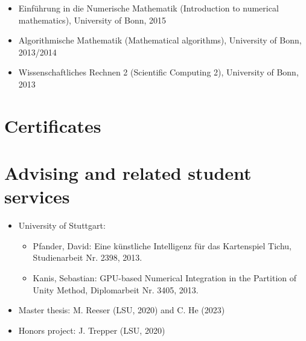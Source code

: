 \documentclass[11pt,a4paper,sans]{moderncv}
\begin{document}
\begin{itemize}[leftmargin=4cm]
\item Einf\"uhrung in die Numerische Mathematik (Introduction to numerical mathematics), University of Bonn, 2015
\item Algorithmische Mathematik (Mathematical algorithms), University of Bonn, 2013/2014
\item Wissenschaftliches Rechnen 2 (Scientific Computing 2),  University of Bonn, 2013 
\end{itemize}


\section{Certificates}

\section{Advising and related student services}
\begin{itemize}[leftmargin=4cm]
\item University of Stuttgart:
\begin{itemize}
\item Pfander, David: Eine künstliche Intelligenz für das Kartenspiel Tichu, Studienarbeit Nr. 2398, 2013.
\item Kanis, Sebastian: GPU-based Numerical Integration in the Partition of Unity Method, Diplomarbeit Nr. 3405, 2013.
\end{itemize}
\end{itemize}

\begin{itemize}[leftmargin=4cm]
\item Master thesis: M. Reeser (LSU, 2020) and C. He (2023)
\item Honors project: J. Trepper (LSU, 2020)
\end{itemize}
\end{document}
